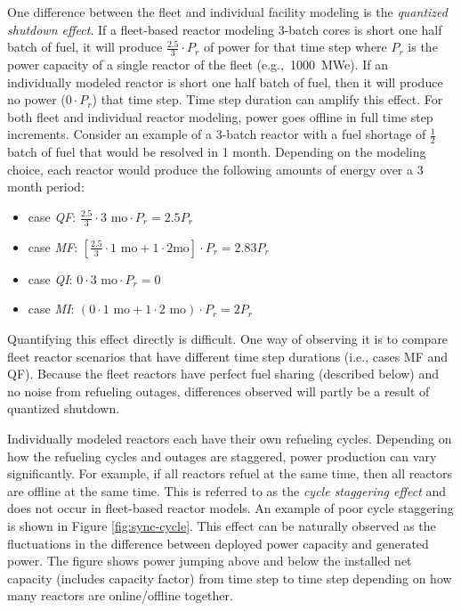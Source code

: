 \documentclass{style}
\begin{document}
One difference between the fleet and individual facility modeling is the
\emph{quantized shutdown effect}.  If a fleet-based reactor modeling 3-batch
cores is short one half batch of fuel, it will produce $\frac{2.5}{3}\cdot P_r$
of power for that time step where $P_r$ is the power capacity of a single
reactor of the fleet (e.g.,~1000~MWe).  If an individually modeled reactor is
short one half batch of fuel, then it will produce no power ($0 \cdot P_r$) that
time step.  Time step duration can amplify this effect.  For both fleet and
individual reactor modeling, power goes offline in full time step increments.
Consider an example of a 3-batch reactor with a fuel shortage of $\frac{1}{2}$ batch of
fuel that would be resolved in 1 month.  Depending on the modeling choice, each reactor
would produce the following amounts of energy over a 3 month period:

\begin{itemize}
  \item case \emph{QF}: $\frac{2.5}{3} \cdot 3 \text{ mo} \cdot P_r = 2.5P_r$
  \item case \emph{MF}: $[\frac{2.5}{3} \cdot 1 \text{ mo} + 1 \cdot 2
    \text{mo}] \cdot P_r = 2.83P_r$
  \item case \emph{QI}: $0 \cdot 3 \text{ mo} \cdot P_r = 0$
  \item case \emph{MI}: $(0\cdot 1 \text{ mo} + 1 \cdot 2\text{ mo}) \cdot P_r = 2 P_r$
\end{itemize}

Quantifying this effect directly is difficult.  One way of observing
it is to compare fleet reactor scenarios that have different time step
durations (i.e., cases MF and QF).  Because the fleet reactors have perfect fuel
sharing (described below) and no noise from refueling outages, differences observed will
partly be a result of quantized shutdown.

Individually modeled reactors each have their own refueling cycles.  Depending
on how the refueling cycles and outages are staggered, power production can
vary significantly.  For example, if all reactors refuel at the same time,
then all reactors are offline at the same time.  This is referred to as the
\emph{cycle staggering effect} and does not occur in fleet-based reactor
models.  An example of poor cycle staggering is shown in Figure
\ref{fig:sync-cycle}.  This effect can be naturally observed as the
fluctuations in the difference between deployed power capacity and generated
power.  The figure shows power jumping above and below the installed net
capacity (includes capacity factor) from time step to time step depending on
how many reactors are online/offline together.
\end{document}
